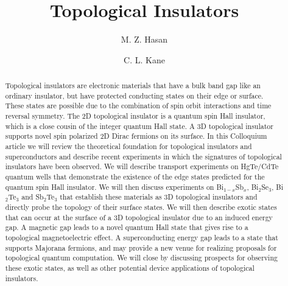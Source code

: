\documentclass[twocolumn,floatfix,showpacs,rmp,aps]{revtex4}
\begin{document}
	\title{Topological Insulators}
	
	\author{M. Z. Hasan}
	
	\author{C. L. Kane}
	
	\begin{abstract}
		Topological insulators are electronic materials that
		have a bulk band gap like an ordinary insulator, but have protected conducting
		states on their edge or surface.  These states are possible due to the combination of spin orbit
		interactions and time reversal symmetry.  The 2D topological insulator is a
		quantum spin Hall insulator, which is a close cousin of the integer
		quantum Hall state. A 3D topological
		insulator supports novel spin polarized 2D Dirac fermions on its surface.  In this
		Colloquium article we will review the theoretical foundation for
		topological insulators and superconductors and describe recent experiments in which
		the signatures of topological insulators have been observed.  We will describe transport
		experiments on HgTe/CdTe quantum wells that demonstrate the
		existence of the edge states predicted for the quantum spin Hall
		insulator. We will then discuss experiments on Bi$_{1-x}$Sb$_x$, Bi$_2$Se$_3$,
		Bi$_2$Te$_3$ and Sb$_2$Te$_3$ that establish these materials as 3D topological
		insulators and directly probe the topology of their surface states.
		We will then describe exotic
		states that can occur at the surface of a 3D topological
		insulator due to an induced energy gap.  A magnetic gap leads to a
		novel quantum Hall state that gives rise to a topological
		magnetoelectric effect.  A superconducting energy gap leads to a
		state that supports Majorana fermions, and may provide a new venue
		for realizing proposals for topological quantum computation.  We will
		close by discussing prospects for observing these exotic states, as
		well as other potential device applications of topological
		insulators.
	\end{abstract}
	
	\maketitle
	\tableofcontents
	
\end{document}
